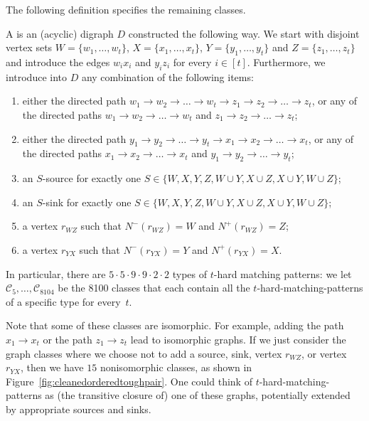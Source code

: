 The following definition specifies the remaining classes. 
\begin{definition}[\hardmatching{t}]
\label{def:cleanedorderedtoughpair}
A \emph{} is
an (acyclic) digraph $D$ constructed the following way. We start with disjoint vertex sets $W = \{w_1,\ldots,w_t\}$, $X = \{x_1,\ldots,x_t\}$, $Y = \{y_1,\ldots,y_t\}$ and $Z = \{z_1,\ldots,z_t\}$ and introduce the edges $w_ix_i$ and $y_iz_i$ for every $i\in[t]$.
Furthermore, we introduce into $D$ any combination of the following items:
\begin{enumerate}
\item either the directed path $w_1 \rightarrow w_2 \rightarrow \ldots \rightarrow w_t \rightarrow z_1 \rightarrow z_2 \rightarrow \ldots \rightarrow z_t$, or any of the directed paths $w_1 \rightarrow w_2 \rightarrow \ldots \rightarrow w_t$ and 
$z_1 \rightarrow z_2 \rightarrow \ldots \rightarrow z_t$;
\item either the directed path $y_1 \rightarrow y_2 \rightarrow \ldots \rightarrow y_t \rightarrow x_1 \rightarrow x_2 \rightarrow \ldots \rightarrow x_t$, or any of the directed paths $x_1 \rightarrow x_2 \rightarrow \ldots \rightarrow x_t$ and $y_1 \rightarrow y_2 \rightarrow \ldots \rightarrow y_t$;
\item an $S$-source for exactly one $S \in \{W,X,Y,Z,W \cup Y,X \cup Z,X \cup Y,W \cup Z\}$;
\item an $S$-sink for exactly one $S \in \{W,X,Y,Z,W \cup Y,X \cup Z,X \cup Y,W \cup Z\}$;
\item a vertex $r_{WZ}$ such that $N^-(r_{WZ}) = W$ and $N^+(r_{WZ}) = Z$;
\item a vertex $r_{YX}$ such that $N^-(r_{YX}) = Y$ and $N^+(r_{YX}) = X$.
\end{enumerate}
In particular, there are $5 \cdot 5 \cdot 9 \cdot 9 \cdot 2 \cdot 2$ types of $t$-hard matching patterns: we let $\mathcal{C}_5, \ldots, \mathcal{C}_{8104}$ be the 8100 classes that each contain all the $t$-hard-matching-patterns of a specific type for every~$t$.
\end{definition}
Note that some of these classes are isomorphic. For example, adding the path $x_1\to x_t$ or the path $z_1\to z_t$ lead to isomorphic graphs. If we just consider the graph classes where we choose not to add a source, sink, vertex $r_{WZ}$, or vertex $r_{YX}$, then we have $15$ nonisomorphic classes, as shown in Figure~\ref{fig:cleanedorderedtoughpair}. One could think of $t$-hard-matching-patterns as (the transitive closure of) one of these graphs, potentially extended by appropriate sources and sinks.

